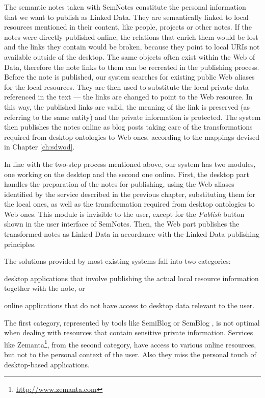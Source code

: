 The semantic notes taken with SemNotes constitute the personal information that we want to publish as Linked Data. They are semantically linked to local resources mentioned in their content, like people, projects or other notes. If the notes were directly published online, the relations that enrich them would be lost and the links they contain would be broken, because they point to local URIs not available outside of the desktop. The same objects often exist within the Web of Data, therefore the note links to them can be recreated in the publishing process. Before the note is published, our system searches for existing public Web aliases for the local resources. They are then used to substitute the local private data referenced in the text --- the links are changed to point to the Web resource. In this way, the published links are valid, the meaning of the link is preserved (as referring to the same entity) and the private information is protected. The system then publishes the notes online as blog posts 
taking care of the transformations required from desktop ontologies to Web ones, according to the mappings devised in Chapter \ref{ch:sdwod}.

In line with the two-step process mentioned above, our system has two modules, one working on the desktop and the second one online. First, the desktop part handles the preparation of the notes for publishing, using the Web aliases identified by the service described in the previous chapter, substituting them for the local ones, as well as the transformation required from desktop ontologies to Web ones. This module is invisible to the user, except for the \emph{Publish} button shown in the user interface of SemNotes. Then, the Web part publishes the transformed notes as Linked Data in accordance with the Linked Data publishing principles.

The solutions provided by most existing systems fall into two categories: \begin{inparaenum}[(i)] \item desktop applications that involve publishing the actual local resource information together with the note, or \item online applications that do not have access to desktop data relevant to the user. \end{inparaenum} The first category, represented by tools like SemiBlog \cite{Moeller2005} or SemBlog \cite{Takeda2005}, is not optimal when dealing with resources that contain sensitive private information. Services like Zemanta\footnote{\url{http://www.zemanta.com}}, from the second category, have access to various online resources, but not to the personal context of the user.
Also they miss the personal touch of desktop-based applications.
